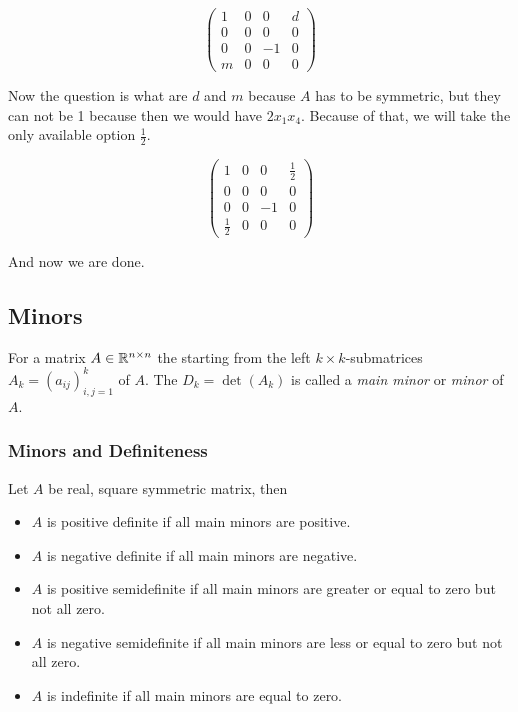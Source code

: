 \[
    \begin{pmatrix}
        1 & 0 & 0 & d \\
        0 & 0 & 0 & 0 \\
        0 & 0 & -1 & 0 \\
        m & 0 & 0 & 0  
    \end{pmatrix}
\]

Now the question is what are \(d\) and \(m\) because \(A\) has to be symmetric, but they can not be 1 
because then we would have \(2x_1 x_4\). Because of that, we will take the only available option 
\(\frac{1}{2}\).

\[
    \begin{pmatrix}
        1 & 0 & 0 & \frac{1}{2} \\
        0 & 0 & 0 & 0 \\
        0 & 0 & -1 & 0 \\
        \frac{1}{2} & 0 & 0 & 0  
    \end{pmatrix}
\]

And now we are done.

\subsection{Minors}

For a matrix \(A \in \mathbb{R}^{n \times n}\) the starting from the left \(k \times k\)-submatrices 
\(A_k = (a_{ij})_{i,j=1}^{k}\) of \(A\). The \(D_k  = \det(A_k)\) is called a \emph{main minor} or 
\emph{minor} of \(A\).

\subsubsection{Minors and Definiteness}

Let \(A\) be real, square symmetric matrix, then

\begin{itemize}
    
    \item \(A\) is positive definite if all main minors are positive.

    \item \(A\) is negative definite if all main minors are negative.

    \item \(A\) is positive semidefinite if all main minors are greater or equal to zero but not all zero. 

    \item \(A\) is negative semidefinite if all main minors are less or equal to zero but not all zero.

    \item \(A\) is indefinite if all main minors are equal to zero.

\end{itemize}

